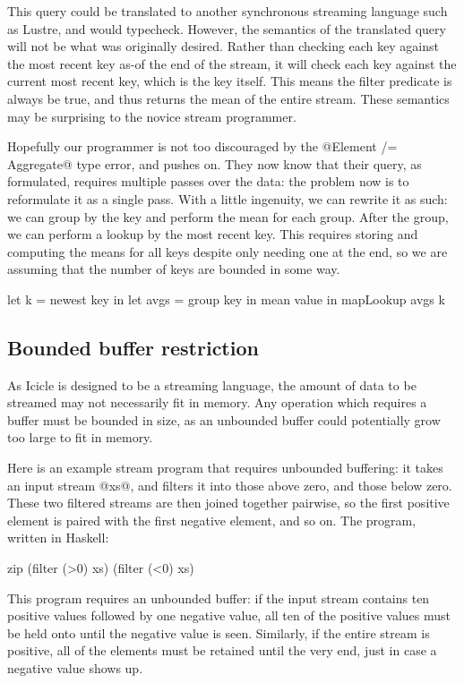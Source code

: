 This query could be translated to another synchronous streaming language such as {\sc Lustre}\cite{halbwachs1991synchronous}, and would typecheck.
However, the semantics of the translated query will not be what was originally desired.
Rather than checking each key against the most recent key as-of the end of the stream,
it will check each key against the current most recent key, which is the key itself.
This means the filter predicate is always be true, and thus returns the mean of the entire stream.
These semantics may be surprising to the novice stream programmer.

Hopefully our programmer is not too discouraged by the @Element /= Aggregate@ type error, and pushes on.
They now know that their query, as formulated, requires multiple passes over the data: the problem now is to reformulate it as a single pass.
With a little ingenuity, we can rewrite it as such: we can group by the key and perform the mean for each group.
After the group, we can perform a lookup by the most recent key.
This requires storing and computing the means for all keys despite only needing one at the end, so we are assuming that the number of keys are bounded in some way.

\begin{code}
   let k    = newest key
in let avgs = group  key in mean value
in mapLookup avgs k
\end{code}

\subsection{Bounded buffer restriction}
\label{s:IcicleSource:bounded}
As Icicle is designed to be a streaming language, the amount of data to be streamed may not necessarily fit in memory.
Any operation which requires a buffer must be bounded in size, as an unbounded buffer could potentially grow too large to fit in memory.

Here is an example stream program that requires unbounded buffering:
it takes an input stream @xs@, and filters it into those above zero, and those below zero.
These two filtered streams are then joined together pairwise, so the first positive element is paired with the first negative element, and so on.
The program, written in Haskell:

\begin{code}
zip (filter (>0) xs) (filter (<0) xs)
\end{code}

This program requires an unbounded buffer: if the input stream contains ten positive values followed by one negative value, all ten of the positive values must be held onto until the negative value is seen.
Similarly, if the entire stream is positive, all of the elements must be retained until the very end, just in case a negative value shows up.

